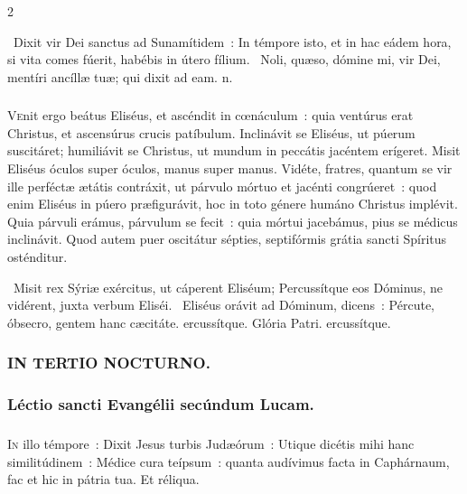\documentclass[9pt,twoside]{extarticle}
\begin{document}
\begin{multicols}{2}
\begin{tightlist}{}
\item {}~Dixit vir Dei sanctus ad Sunamítidem~: \textred{*} In témpore isto, et in hac eádem hora, si vita comes fúerit, habébis in útero fílium. ~Noli, quæso, dómine mi, vir Dei, mentíri ancíllæ tuæ; qui dixit ad eam. n.
\end{tightlist}

\subsubsection*{\center {}}
\lettrine{V}enit ergo beátus Eliséus, et ascéndit in cœnáculum~: quia ventúrus erat Christus, et ascensúrus crucis patíbulum. Inclinávit se Eliséus, ut púerum suscitáret; humiliávit se Christus, ut mundum in peccátis jacéntem erígeret. Misit Eliséus óculos super óculos, manus super manus. Vidéte, fratres, quantum se vir ille perféctæ ætátis contráxit, ut párvulo mórtuo et jacénti congrúeret~: quod enim Eliséus in púero præfigurávit, hoc in toto génere humáno Christus implévit. Quia párvuli erámus, párvulum se fecit~: quia mórtui jacebámus, pius se médicus inclinávit. Quod autem puer oscitátur sépties, septifórmis grátia sancti Spíritus osténditur.

\begin{tightlist}{}
\item {}~Misit rex Sýriæ exércitus, ut cáperent Eliséum; \textred{*} Percussítque eos Dóminus, ne vidérent, juxta verbum Eliséi. ~Eliséus orávit ad Dóminum, dicens~: Pércute, óbsecro, gentem hanc cæcitáte. ercussítque. Glória Patri. ercussítque.
\end{tightlist}

\subsubsection*{\center \textsc{IN TERTIO NOCTURNO.}}
\subsubsection*{\center Léctio sancti Evangélii secúndum Lucam.}
\subsubsection*{\center {}}
\lettrine{I}n illo témpore~: Dixit Jesus turbis Judæórum~: Utique dicétis mihi hanc similitúdinem~: Médice cura teípsum~: quanta audívimus facta in Caphárnaum, fac et hic in pátria tua. Et réliqua.


\end{multicols}
\end{document}
